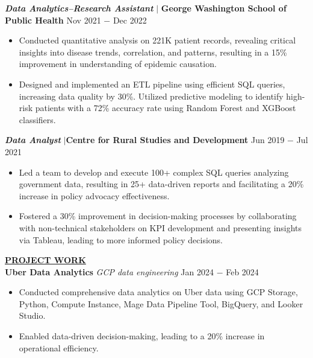 \documentclass{article}
\begin{document}
\noindent \textit{\textbf{Data Analytics–Research Assistant}} $\mid$ \textbf{George Washington School of Public Health} \hfill  
 \hfill Nov 2021 $-$ Dec 2022
\begin{itemize}[noitemsep,nolistsep,leftmargin=*]
\item {Conducted quantitative analysis on 221K patient records, revealing critical insights into disease trends, correlation, and patterns, resulting in a 15\% improvement in understanding of epidemic causation.}
\item{Designed and implemented an ETL pipeline using efficient SQL queries, increasing data quality by 30\%. Utilized predictive modeling to identify high-risk patients with a 72\% accuracy rate using Random Forest and XGBoost classifiers.}
\end{itemize}

\noindent \textit{\textbf{Data Analyst}} $\mid$\textbf{Centre for Rural Studies and Development} \hfill
 \hfill Jun 2019 $-$ Jul 2021
\begin{itemize} [noitemsep,nolistsep,leftmargin=*]
\item {Led a team to develop and execute 100+ complex SQL queries analyzing government data, resulting in 25+ data-driven reports and facilitating a 20\% increase in policy advocacy effectiveness.}
\item {Fostered a 30\% improvement in decision-making processes by collaborating with non-technical stakeholders on KPI development and presenting insights via Tableau, leading to more informed policy decisions.\\}



\end{itemize}
%
%
\noindent \textbf{\underline{PROJECT WORK}} \\
\noindent \textbf{Uber Data Analytics} \textit{GCP data engineering}   \hfill  Jan 2024 $-$ Feb 2024
\begin{itemize}[noitemsep,nolistsep,leftmargin=*]
\item {Conducted comprehensive data analytics on Uber data using GCP Storage, Python, Compute Instance, Mage Data Pipeline Tool, BigQuery, and Looker Studio.}
\item {Enabled data-driven decision-making, leading to a 20\% increase in operational efficiency.}

\end{itemize}
\end{document}
